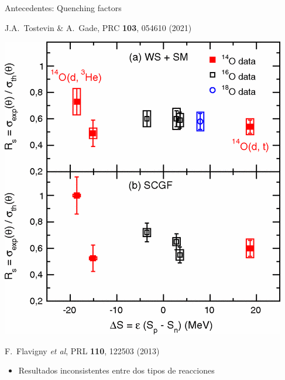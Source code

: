 \documentclass{beamer}
\begin{document}
\begin{frame}{Antecedentes: Quenching factors}
\begin{minipage}{0.45\textwidth}
\begin{center}
    \tiny J.A.~Tostevin \& A.~Gade, PRC \textbf{103}, 054610 (2021)
    \end{center}
    \end{minipage}
    \begin{minipage}{0.45\textwidth}
    \begin{center}
    \includegraphics[height=0.4\textheight]{flavigny.png}
    
    \tiny F.~Flavigny \textit{et al}, PRL \textbf{110}, 122503 (2013)
    \end{center}
    \end{minipage}
    \vspace{1cm}
    \begin{itemize}
    \item Resultados inconsistentes entre dos tipos de reacciones
    \end{itemize}
    
\end{frame}
\end{document}
